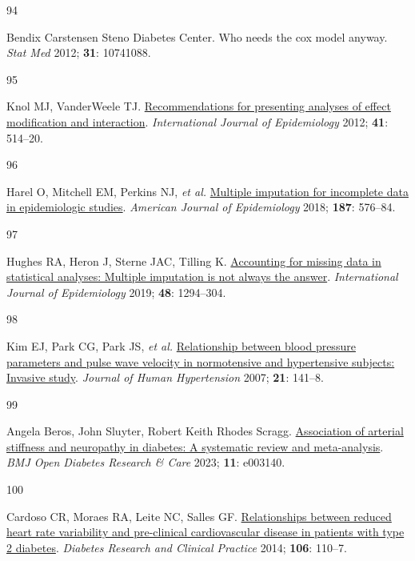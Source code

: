 \documentclass[
  a4paper,
  headsepline=true,
  open=left]{scrbook}
\newlength{\cslhangindent}
\newlength{\csllabelwidth}
\newlength{\cslentryspacingunit} %
\newenvironment{CSLReferences}[2] %
 {%
  \setlength{\parindent}{0pt}
  \ifodd #1
  \let\oldpar\par
  \def\par{\hangindent=\cslhangindent\oldpar}
  \fi
  \setlength{\parskip}{#2\cslentryspacingunit}
 }%
 {}
\newcommand{\CSLLeftMargin}[1]{\parbox[t]{\csllabelwidth}{#1}}
\newcommand{\CSLRightInline}[1]{\parbox[t]{\linewidth - \csllabelwidth}{#1}\break}
\begin{document}
\begin{CSLReferences}{0}{0}
\leavevmode{}%
\CSLLeftMargin{94 }%
\CSLRightInline{Bendix Carstensen Steno Diabetes Center. Who needs the
cox model anyway. \emph{Stat Med} 2012; \textbf{31}: 10741088.}

\leavevmode{}%
\CSLLeftMargin{95 }%
\CSLRightInline{Knol MJ, VanderWeele TJ.
\href{https://doi.org/10.1093/ije/dyr218}{Recommendations for presenting
analyses of effect modification and interaction}. \emph{International
Journal of Epidemiology} 2012; \textbf{41}: 514--20.}

\leavevmode{}%
\CSLLeftMargin{96 }%
\CSLRightInline{Harel O, Mitchell EM, Perkins NJ, \emph{et al.}
\href{https://doi.org/10.1093/aje/kwx349}{Multiple imputation for
incomplete data in epidemiologic studies}. \emph{American Journal of
Epidemiology} 2018; \textbf{187}: 576--84.}

\leavevmode{}%
\CSLLeftMargin{97 }%
\CSLRightInline{Hughes RA, Heron J, Sterne JAC, Tilling K.
\href{https://doi.org/10.1093/ije/dyz032}{Accounting for missing data in
statistical analyses: Multiple imputation is not always the answer}.
\emph{International Journal of Epidemiology} 2019; \textbf{48}:
1294--304.}

\leavevmode{}%
\CSLLeftMargin{98 }%
\CSLRightInline{Kim EJ, Park CG, Park JS, \emph{et al.}
\href{https://doi.org/10.1038/sj.jhh.1002120}{Relationship between blood
pressure parameters and pulse wave velocity in normotensive and
hypertensive subjects: Invasive study}. \emph{Journal of Human
Hypertension} 2007; \textbf{21}: 141--8.}

\leavevmode{}%
\CSLLeftMargin{99 }%
\CSLRightInline{Angela Beros, John Sluyter, Robert Keith Rhodes Scragg.
\href{https://doi.org/10.1136/bmjdrc-2022-003140}{Association of
arterial stiffness and neuropathy in diabetes: A systematic review and
meta-analysis}. \emph{BMJ Open Diabetes Research \& Care} 2023;
\textbf{11}: e003140.}

\leavevmode{}%
\CSLLeftMargin{100 }%
\CSLRightInline{Cardoso CR, Moraes RA, Leite NC, Salles GF.
\href{https://doi.org/10.1016/j.diabres.2014.07.005}{Relationships
between reduced heart rate variability and pre-clinical cardiovascular
disease in patients with type 2 diabetes}. \emph{Diabetes Research and
Clinical Practice} 2014; \textbf{106}: 110--7.}


\end{CSLReferences}
\end{document}
